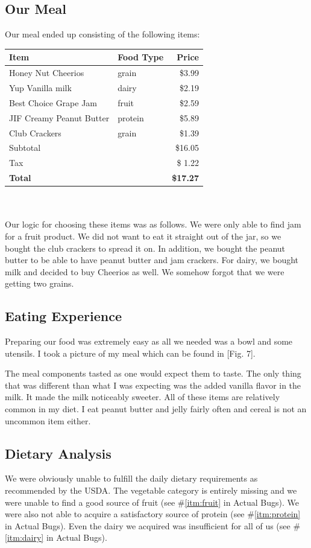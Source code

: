 \documentclass[11pt]{article}
\begin{document}
\subsection{Our Meal}
Our meal ended up consisting of the following items: \\

\begin{tabular}{ l l r }
    Item & Food Type & Price \\
    \hline\hline
    Honey Nut Cheerios & grain & \$3.99 \\
    Yup Vanilla milk & dairy & \$2.19 \\
    Best Choice Grape Jam & fruit & \$2.59 \\
    JIF Creamy Peanut Butter & protein & \$5.89 \\
    Club Crackers & grain & \$1.39 \\
    \hline
    Subtotal & & \$16.05 \\
    Tax & & \$ 1.22 \\
    \textbf{Total} & & \textbf{\$17.27}
\end{tabular}
\\\\
Our logic for choosing these items was as follows. We were only able to find jam for a fruit
product. We did not want to eat it straight out of the jar, so we bought the club crackers to spread
it on. In addition, we bought the peanut butter to be able to have peanut butter and jam crackers.
For dairy, we bought milk and decided to buy Cheerios as well. We somehow forgot that we were
getting two grains.

\subsection{Eating Experience}
Preparing our food was extremely easy as all we needed was a bowl and some utensils. I took a
picture of my meal which can be found in [Fig. 7].

The meal components tasted as one would expect them to taste. The only thing that was different
than what I was expecting was the added vanilla flavor in the milk. It made the milk noticeably
sweeter. All of these items are relatively common in my diet. I eat peanut butter and jelly fairly
often and cereal is not an uncommon item either.

\subsection{Dietary Analysis}
We were obviously unable to fulfill the daily dietary requirements as recommended by the USDA. The
vegetable category is entirely missing and we were unable to find a good source of fruit
(see \#\ref{itm:fruit} in Actual Bugs). We were also not able to acquire a satisfactory source of
protein (see \#\ref{itm:protein} in Actual Bugs). Even the dairy we acquired was insufficient for
all of us (see \#\ref{itm:dairy} in Actual Bugs).
\end{document}
